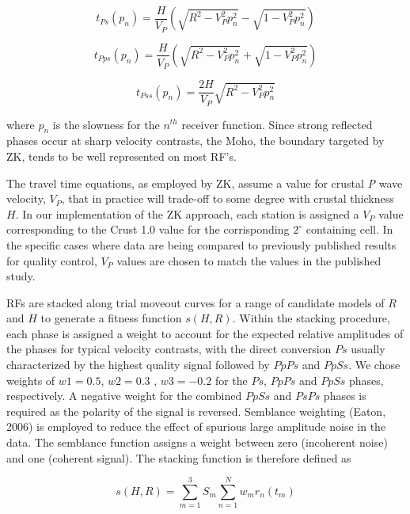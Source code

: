 \documentclass[review]{elsarticle}
\begin{document}
\begin{equation} \label{eq:tps}
t_{Ps}(p_n) = \frac{H}{V_P} \left( \sqrt{ R^2 - V_P^2p_n^2} - \sqrt{1 - V_P^2p_n^2} \right)
\end{equation}

\begin{equation}
t_{Pps}(p_n) = \frac{H}{V_P} \left( \sqrt{ R^2 - V_P^2p_n^2} + \sqrt{1 - V_P^2p_n^2} \right)
\end{equation}

\begin{equation}
t_{Pss}(p_n)= \frac{2H}{V_P} \sqrt{ R^2 - V_P^2p_n^2}
\end{equation}

\noindent where $p_n$ is the slowness for the $n^{th}$ receiver function. Since strong reflected phases occur at sharp velocity contrasts, the Moho, the boundary targeted by ZK, tends to be well represented on most RF's.

The travel time equations, as employed by ZK, assume a value for crustal {\it P} wave velocity, $V_P$, that in practice will trade-off to some degree with crustal thickness $H$. In our implementation of the ZK approach, each station is assigned a $V_P$ value corresponding to the Crust 1.0 value for the corrisponding $2^\circ$ containing cell. In the specific cases where data are being compared to previously published results for quality control, $V_P$  values are chosen to match the values in the published study.

RFs are stacked along trial moveout curves for a range of candidate models of $R$ and $H$ to generate a fitness function $s(H,R)$.  Within the stacking procedure, each phase is assigned a weight to account for the expected relative amplitudes of the phases for typical velocity contrasts, with the direct conversion $Ps$ usually characterized by the highest quality signal followed by $PpPs$ and $PpSs$. We chose weights of $w1 = 0.5$, $w2 = 0.3$ , $w3 = -0.2$ for the $Ps$, $PpPs$ and $PpSs$ phases, respectively. A negative weight for the combined $PpSs$ and $PsPs$ phases is required as the polarity of the signal is reversed. Semblance weighting (Eaton, 2006) is employed to reduce the effect of spurious large amplitude noise in the data. The semblance function assigns a weight between zero (incoherent noise) and one (coherent signal). The stacking function is therefore defined as

\begin{equation}  \label{eq:stack}
s(H,R) = \sum_{m=1}^{3} S_m \sum_{n=1}^N w_mr_n(t_m)
\end{equation}
\end{document}
